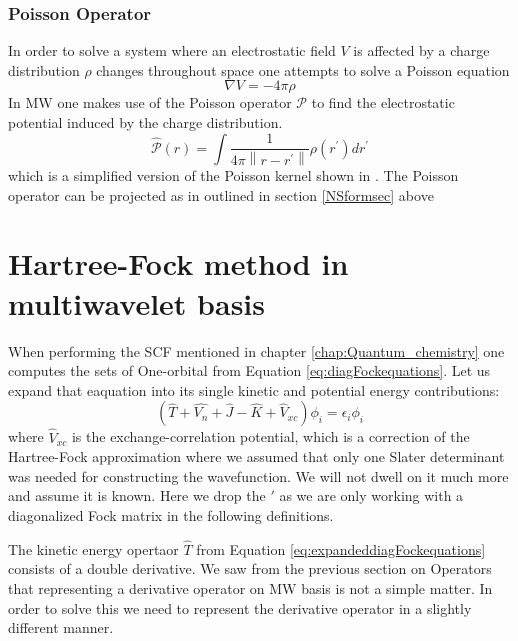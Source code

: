 \documentclass[../master_thesis.tex]{subfiles}
\begin{document}
\subsubsection{Poisson Operator}
In order to solve a system where an electrostatic field $V$ is affected by a
charge distribution $\rho$ changes throughout space one attempts to solve a Poisson equation
\begin{equation}
  \nabla V = -4\pi \rho
\end{equation}
In \ac{MW} one makes use of the Poisson operator $\mathscr{P}$ to
find the electrostatic potential induced by the charge distribution.
\begin{equation}\label{eq:Poissonopmw}
\hat{\mathscr{P}}(r)=\int \frac{1}{4 \pi\left\|r-r^{\prime}\right\|} \rho\left(r^{\prime}\right)
d r^{\prime}
\end{equation}
which is a simplified version of the Poisson kernel shown in \cite{Frediani:2013}.
The Poisson operator can be projected as in outlined in section \ref{NSformsec} above

\section{Hartree-Fock method in multiwavelet basis}
When performing the \ac{SCF} mentioned in chapter \ref{chap:Quantum_chemistry} one
computes the sets of One-orbital \eifuncs  from Equation \ref{eq:diagFockequations}.
Let us expand that eaquation into its single kinetic and potential energy contributions:
\begin{equation}\label{eq:expandeddiagFockequations}
  \left(\hat{T} + \hat{V_n} + \hat{J} - \hat{K} + \hat{V}_{xc}\right)\phi_i = \epsilon_i\phi_i
\end{equation}
where $\hat{V}_{xc}$ is the exchange-correlation potential, which is a correction of the Hartree-Fock
approximation where we assumed that only one Slater determinant was needed for
constructing the wavefunction. We will not dwell on it much more and
assume it is known. Here we drop the $\prime$ as we are only working with a diagonalized Fock matrix
in the following definitions.

The kinetic energy opertaor $\hat{T}$ from Equation \ref{eq:expandeddiagFockequations}
consists of a double derivative. We saw from the previous section on Operators
that representing a derivative operator on \ac{MW} basis is not a simple matter.
In order to solve this we need to represent the derivative operator in a slightly
different manner.
\end{document}
